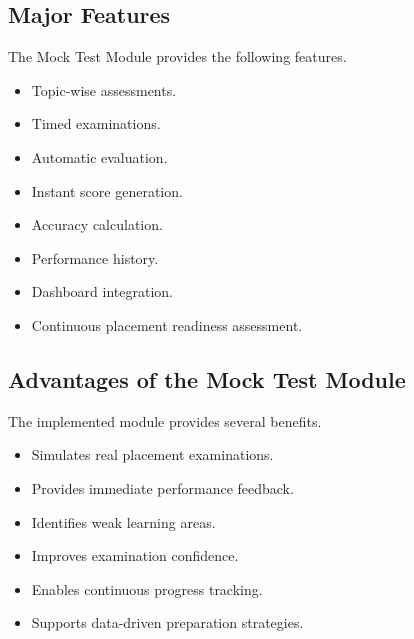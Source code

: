 \subsection{Major Features}

The Mock Test Module provides the following features.

\begin{itemize}

\item Topic-wise assessments.

\item Timed examinations.

\item Automatic evaluation.

\item Instant score generation.

\item Accuracy calculation.

\item Performance history.

\item Dashboard integration.

\item Continuous placement readiness assessment.

\end{itemize}

\subsection{Advantages of the Mock Test Module}

The implemented module provides several benefits.

\begin{itemize}

\item Simulates real placement examinations.

\item Provides immediate performance feedback.

\item Identifies weak learning areas.

\item Improves examination confidence.

\item Enables continuous progress tracking.

\item Supports data-driven preparation strategies.

\end{itemize}

